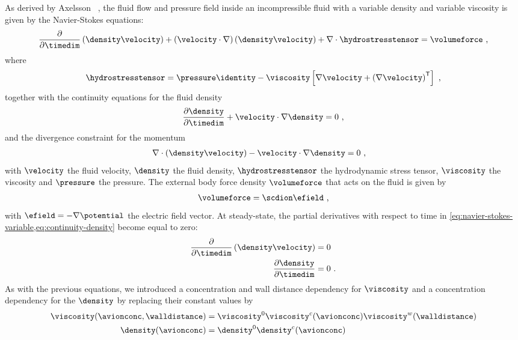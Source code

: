 As derived by Axelsson \etal{}~\cite{Axelsson-2015}, the fluid flow and pressure field inside an
incompressible fluid with a variable density and variable viscosity is given by the Navier-Stokes equations:
%
\begin{align}
  \label{eq:navier-stokes-variable}
  \dfrac{\partial}{\partial \timedim} \left( \density \velocity \right) +
  \left( \velocity \cdot \nabla \right) \left( \density\velocity \right)
  + \nabla \cdot \hydrostresstensor = \volumeforce
  \text{ ,}
\end{align}
%
where
%
\begin{align}
  \hydrostresstensor =
  \pressure\identity - \viscosity\left[\nabla\velocity+\left(\nabla\velocity \right)^\mathsf{T}\right]
  \text{ ,}
\end{align}
%
together with the continuity equations for the fluid density
%
\begin{align}
  \label{eq:continuity-density}
  \dfrac{\partial \density}{\partial \timedim} + \velocity \cdot \nabla \density  = 0
  \text{ ,}
\end{align}
%
and the divergence constraint for the momentum
%
\begin{align}
  \nabla \cdot \left( \density\velocity \right) - \velocity \cdot \nabla \density ={}& 0
  \text{ ,}
\end{align}
%
with $\velocity$ the fluid velocity, $\density$ the fluid density, $\hydrostresstensor$ the hydrodynamic
stress tensor, $\viscosity$ the viscosity and $\pressure$ the pressure. The external body force density
$\volumeforce$ that acts on the fluid is given by
%
\begin{align}\label{eq:ion_force_density}
  \volumeforce = \scdion \efield
  \text{ ,}
\end{align}
%
with $\efield = - \nabla \potential$ the electric field vector. At steady-state, the partial derivatives with
respect to time in \cref{eq:navier-stokes-variable,eq:continuity-density} become equal to zero:
%
\begin{align}
  \dfrac{\partial}{\partial \timedim} \left( \density \velocity \right) ={}& 0 \\
  \dfrac{\partial \density}{\partial \timedim} ={}& 0
  \text{ .}
\end{align}
%
As with the previous equations, we introduced a concentration and wall distance dependency for $\viscosity$
and a concentration dependency for the $\density$ by replacing their constant values by
%
\begin{align}\label{eq:epnp-ns_viscosity_density}
  \viscosity(\avionconc,\walldistance) ={}&
    \viscosity^0 \viscosity^c(\avionconc) \viscosity^w(\walldistance) \\
  \density(\avionconc) ={}&
    \density^0 \density^c(\avionconc)
\end{align}
